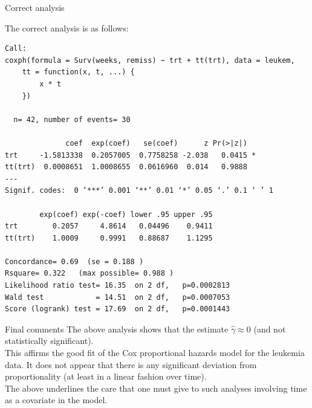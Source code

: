 \documentclass[envcountsect, 10pt, portrait, palatino]{beamer}
\begin{document}
\begin{frame}[fragile]{Correct analysis}

The correct analysis is as follows:
\scriptsize
\begin{verbatim}
Call:
coxph(formula = Surv(weeks, remiss) ~ trt + tt(trt), data = leukem,
    tt = function(x, t, ...) {
        x * t
    })

  n= 42, number of events= 30

              coef  exp(coef)   se(coef)      z Pr(>|z|)
trt     -1.5813338  0.2057005  0.7758258 -2.038   0.0415 *
tt(trt)  0.0008651  1.0008655  0.0616960  0.014   0.9888
---
Signif. codes:  0 ‘***’ 0.001 ‘**’ 0.01 ‘*’ 0.05 ‘.’ 0.1 ‘ ’ 1

        exp(coef) exp(-coef) lower .95 upper .95
trt        0.2057     4.8614   0.04496    0.9411
tt(trt)    1.0009     0.9991   0.88687    1.1295

Concordance= 0.69  (se = 0.188 )
Rsquare= 0.322   (max possible= 0.988 )
Likelihood ratio test= 16.35  on 2 df,   p=0.0002813
Wald test            = 14.51  on 2 df,   p=0.0007053
Score (logrank) test = 17.69  on 2 df,   p=0.0001443
\end{verbatim}
\end{frame}
\begin{frame}{Final comments}
The above analysis shows that the estimate $\hat{\gamma}\approx 0$ (and not statistically significant).\\[2ex]
This affirms the good fit of the Cox proportional hazards model for the leukemia data.
It does not appear that there is any significant deviation from proportionality (at least in a linear fashion over time).\\[2ex]
The above underlines the care that one must give to such analyses involving time as a covariate in the model.
\end{frame}
\end{document}
